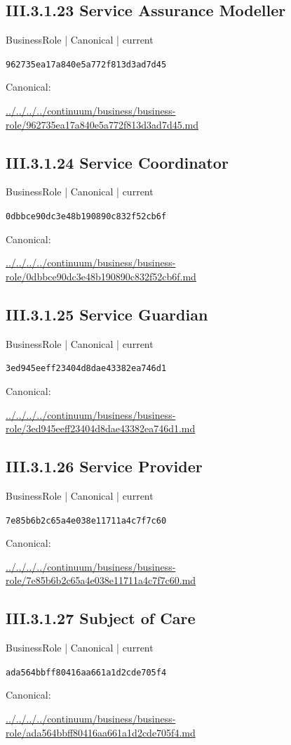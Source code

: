 \documentclass[10pt,a4paper]{article}
\begin{document}
\subsection*{III.3.1.23 Service Assurance Modeller}
{\small BusinessRole | Canonical | current}\par
\texttt{962735ea17a840e5a772f813d3ad7d45}\par
Canonical: \par
{\footnotesize\url{../../../../continuum/business/business-role/962735ea17a840e5a772f813d3ad7d45.md}}\par
\subsection*{III.3.1.24 Service Coordinator}
{\small BusinessRole | Canonical | current}\par
\texttt{0dbbce90dc3e48b190890c832f52cb6f}\par
Canonical: \par
{\footnotesize\url{../../../../continuum/business/business-role/0dbbce90dc3e48b190890c832f52cb6f.md}}\par
\subsection*{III.3.1.25 Service Guardian}
{\small BusinessRole | Canonical | current}\par
\texttt{3ed945eeff23404d8dae43382ea746d1}\par
Canonical: \par
{\footnotesize\url{../../../../continuum/business/business-role/3ed945eeff23404d8dae43382ea746d1.md}}\par
\subsection*{III.3.1.26 Service Provider}
{\small BusinessRole | Canonical | current}\par
\texttt{7e85b6b2c65a4e038e11711a4c7f7c60}\par
Canonical: \par
{\footnotesize\url{../../../../continuum/business/business-role/7e85b6b2c65a4e038e11711a4c7f7c60.md}}\par
\subsection*{III.3.1.27 Subject of Care}
{\small BusinessRole | Canonical | current}\par
\texttt{ada564bbff80416aa661a1d2cde705f4}\par
Canonical: \par
{\footnotesize\url{../../../../continuum/business/business-role/ada564bbff80416aa661a1d2cde705f4.md}}\par
\end{document}
